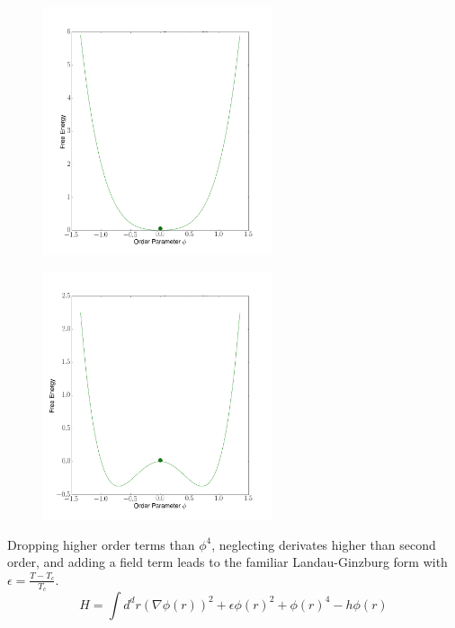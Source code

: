 \begin{figure}[!h]
	\centering
	\includegraphics[width=0.6\textwidth]{Images/Classical.png}
	\label{fig:lg-pos}
\end{figure}%
\begin{figure}[!h]
	\centering
	\includegraphics[width=0.6\textwidth]{Images/ClassicalBroken.png}
	\label{fig:lg-neg}
\end{figure}%
Dropping higher order terms than $\phi^4$, neglecting derivates higher than second order, and adding a field term leads to the familiar Landau-Ginzburg form with $\epsilon=\frac{T-T_c}{T_c}$.%
\begin{equation}
\label{eq:landu-ginz_NN}
H = \!\int d^dr (\nabla \phi(r))^2 + \epsilon \phi(r)^2 + \phi(r)^4 -h \phi(r)
\end{equation}%
